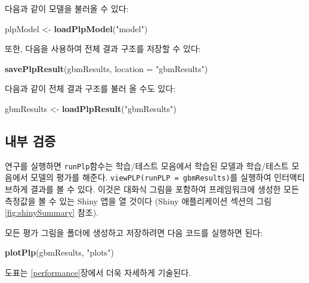 \documentclass[10.5pt]{book}
\newenvironment{Shaded}{\begin{snugshade}}{\end{snugshade}}
\newcommand{\KeywordTok}[1]{\textcolor[rgb]{0.13,0.29,0.53}{\textbf{#1}}}
\newcommand{\DataTypeTok}[1]{\textcolor[rgb]{0.13,0.29,0.53}{#1}}
\newcommand{\StringTok}[1]{\textcolor[rgb]{0.31,0.60,0.02}{#1}}
\newcommand{\NormalTok}[1]{#1}
\theoremstyle{definition}
\theoremstyle{definition}
\theoremstyle{definition}
\theoremstyle{remark}
\begin{document}
다음과 같이 모델을 불러올 수 있다:

\begin{Shaded}
\begin{Highlighting}[]
\NormalTok{plpModel <-}\StringTok{ }\KeywordTok{loadPlpModel}\NormalTok{(}\StringTok{"model"}\NormalTok{)}
\end{Highlighting}
\end{Shaded}

또한, 다음을 사용하여 전체 결과 구조를 저장할 수 있다:

\begin{Shaded}
\begin{Highlighting}[]
\KeywordTok{savePlpResult}\NormalTok{(gbmResults, }\DataTypeTok{location =} \StringTok{"gbmResults"}\NormalTok{)}
\end{Highlighting}
\end{Shaded}

다음과 같이 전체 결과 구조를 불러 올 수도 있다:

\begin{Shaded}
\begin{Highlighting}[]
\NormalTok{gbmResults <-}\StringTok{ }\KeywordTok{loadPlpResult}\NormalTok{(}\StringTok{"gbmResults"}\NormalTok{)}
\end{Highlighting}
\end{Shaded}

\subsection{내부 검증}\label{-}

연구를 실행하면 \texttt{runPlp}함수는 학습/테스트 모음에서 학습된 모델과
학습/테스트 모음에서 모델의 평가를 해준다.
\texttt{viewPLP(runPLP\ =\ gbmResults)}를 실행하여 인터액티브하게 결과를
볼 수 있다. 이것은 대화식 그림을 포함하여 프레임워크에 생성한 모든
측정값을 볼 수 있는 Shiny 앱을 열 것이다 (Shiny 애플리케이션 섹션의 그림
\ref{fig:shinySummary} 참조).

모든 평가 그림을 폴더에 생성하고 저장하려면 다음 코드를 실행하면 된다:

\begin{Shaded}
\begin{Highlighting}[]
\KeywordTok{plotPlp}\NormalTok{(gbmResults, }\StringTok{"plots"}\NormalTok{)}
\end{Highlighting}
\end{Shaded}

도표는 \ref{performance}장에서 더욱 자세하게 기술된다.
\end{document}
